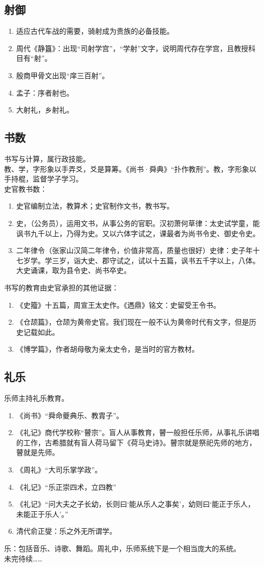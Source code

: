\documentclass[twoside]{article}
\begin{document}
\subsection{射御}
\begin{enumerate}
    \item 适应古代车战的需要，骑射成为贵族的必备技能。
    \item 周代《静簋》：出现``司射学宫''，``学射''文字，说明周代存在学宫，且教授科目有``射''。\\
    \item 殷商甲骨文出现``庠三百射''。
    \item 孟子：序者射也。
    \item 大射礼，乡射礼。
\end{enumerate}
\subsection{书数}
书写与计算，属行政技能。\\
教、学，字形象以手弄爻，爻是算筹。《尚书·舜典》``扑作教刑''。教，字形象以手持棍，监督学子学习。\\
史官教书数：
\begin{enumerate}
    \item 史官编制立法，教算术；史官制作文书，教书写。
    \item 史，（公务员），运用文书，从事公务的官职。汉初萧何草律：太史试学童，能讽书九千以上，乃得为史。又以六体字试之，课最者为尚书令史、御史令史。
    \item 二年律令（张家山汉简二年律令，价值非常高，质量也很好）史律：史子年十七岁学。学三岁，诣大史、郡守试之，试以十五篇，讽书五千字以上，八体。大史诵课，取为县令史、尚书卒史。
\end{enumerate}
书写的教育由史官承担的其他证据：
\begin{enumerate}
    \item 《史籀》十五篇，周宣王太史作。《遤鼎》铭文：史留受王令书。
    \item 《仓颉篇》，仓颉为黄帝史官。我们现在一般不认为黄帝时代有文字，但是历史记载如此。
    \item 《博学篇》，作者胡母敬为亲太史令，是当时的官方教材。
\end{enumerate}
\subsection{礼乐}
乐师主持礼乐教育。
\begin{enumerate}
    \item 《尚书》``舜命夔典乐、教胄子''。
    \item 《礼记》商代学校称``瞽宗''。盲人从事教育，瞽一般担任乐师，从事礼乐讲唱的工作，古希腊就有盲人荷马留下《荷马史诗》。瞽宗就是祭祀先师的地方，瞽就是先师。
    \item 《周礼》``大司乐掌学政''。
    \item 《礼记》``乐正崇四术，立四教''
    \item 《礼记》``问大夫之子长幼，长则曰`能从乐人之事矣'，幼则曰`能正于乐人，未能正于乐人'。''
    \item 清代俞正燮：乐之外无所谓学。
\end{enumerate}
乐：包括音乐、诗歌、舞蹈。周礼中，乐师系统下是一个相当庞大的系统。\\
未完待续……
\end{document}
